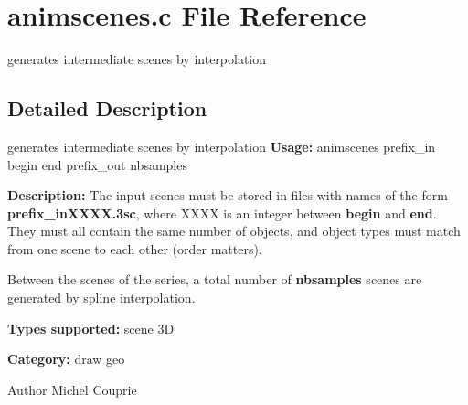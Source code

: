\section{animscenes.c File Reference}
\label{animscenes_8c}


generates intermediate scenes by interpolation  




\subsection{Detailed Description}
generates intermediate scenes by interpolation {\bfseries Usage:} animscenes prefix\_\-in begin end prefix\_\-out nbsamples

{\bfseries Description:} The input scenes must be stored in files with names of the form {\bfseries prefix\_\-inXXXX.3sc}, where XXXX is an integer between {\bfseries begin} and {\bfseries end}. They must all contain the same number of objects, and object types must match from one scene to each other (order matters).

Between the scenes of the series, a total number of {\bfseries nbsamples} scenes are generated by spline interpolation.

{\bfseries Types supported:} scene 3D

{\bfseries Category:} draw geo

\begin{DoxyAuthor}{Author}
Michel Couprie 
\end{DoxyAuthor}
